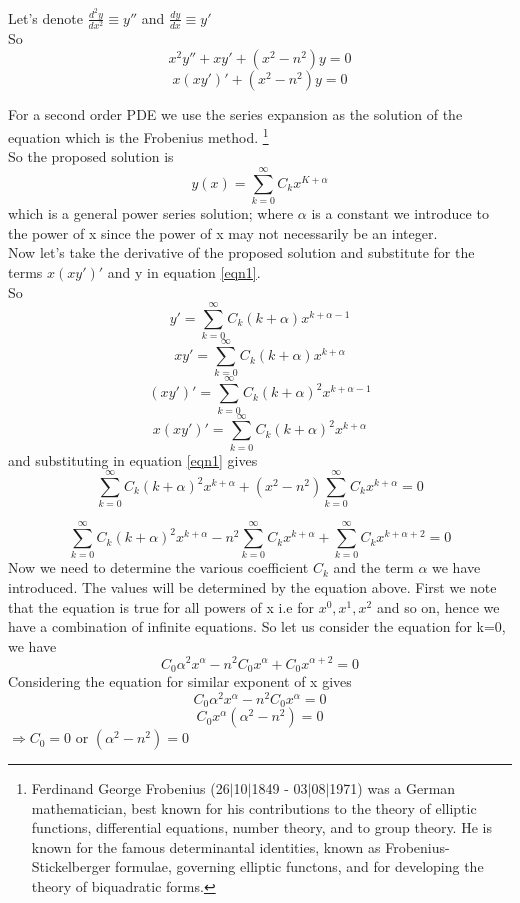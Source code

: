 	  Let's denote $\frac{d^2 y}{dx^2} \equiv y''$ and $\frac{dy}{dx} \equiv y'$
	  \\
	  So 
	  $$x^2y'' + xy' + (x^2 - n^2)y = 0$$
	  \begin{equation}
	  	x(xy')' + (x^2 - n^2)y = 0
	  	\label{eqn1}
	  \end{equation} 
	  
	  For a second order PDE we use the series expansion as the solution of the equation which is the Frobenius method.
	 	\footnote{Ferdinand George Frobenius  (26$|$10$|$1849 - 03$|$08$|$1971) was a German mathematician, best known for his contributions to the theory of elliptic functions, differential equations, number theory, and to group theory. He is known for the famous determinantal identities, known as Frobenius- Stickelberger formulae, governing elliptic functons, and for developing the theory of biquadratic forms.}
	  \\
	  So the proposed solution is 
	  $$y(x) = \sum_{k=0}^{\infty}C_k x^{K + \alpha} $$
	  which is a general power series solution; where $\alpha$ is a constant we introduce to the power of x since the power of x may not necessarily be an integer. \\
	  Now let's take the derivative of the proposed solution and substitute for the terms $x(xy')'$ and y in equation \ref{eqn1}.
	  \\
	  So
	  $$y' = \sum_{k=0}^{\infty}C_k (k + \alpha) x^{k + \alpha - 1}$$
	  $$xy' = \sum_{k=0}^{\infty}C_k (k + \alpha) x^{k + \alpha}$$
	  $$(xy')' = \sum_{k=0}^{\infty}C_k (k + \alpha)^2 x^{k + \alpha - 1}$$
	  $$x(xy')' = \sum_{k=0}^{\infty}C_k (k + \alpha)^2 x^{k + \alpha}$$
	  and substituting in equation \ref{eqn1} gives
	  $$\sum_{k=0}^{\infty}C_k (k + \alpha)^2 x^{k + \alpha} + (x^2 - n^2)\sum_{k=0}^{\infty}C_k x^{k + \alpha} = 0 $$
	  
 	 $$\sum_{k=0}^{\infty}C_k (k + \alpha)^2 x^{k + \alpha} - n^2\sum_{k=0}^{\infty}C_k x^{k + \alpha} + \sum_{k=0}^{\infty}C_k x^{k + \alpha + 2} = 0 $$
 	 Now we need to determine the various coefficient $C_k$ and the term $\alpha$ we have introduced. The values will be determined by the equation above. First we note that the equation is true for all powers of x i.e for $x^0, x^1 , x^2$ and so on, hence we have a combination of infinite equations. So let us consider the equation for k=0, we have 
   	$$ C_0 \alpha^2 x^\alpha - n^2C_0 x^\alpha + C_0 x^{\alpha + 2} =0$$ 
	 Considering the equation for similar exponent of x gives 
	 $$ C_0 \alpha^2 x^\alpha - n^2C_0 x^\alpha =0$$
	 $$ C_0 x^\alpha(\alpha^2 -n^2) =0$$
	$\Rightarrow C_0 =0$ or $(\alpha^2 -n^2) =0$ 
	
